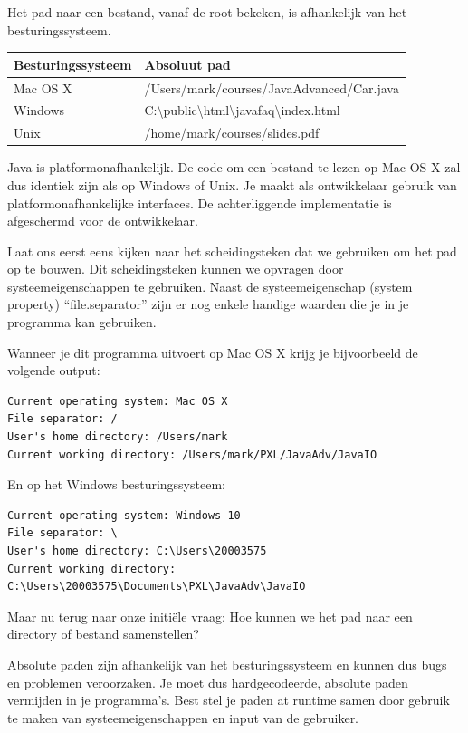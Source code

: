 Het pad naar een bestand, vanaf de root bekeken, is afhankelijk van het besturingssysteem.

\begin{table}[h!]
\centering
\begin{tabularx}{\textwidth}{| l | X |}
 \hline
 Besturingssysteem & Absoluut pad\\ 
 \hline
 Mac OS X & /Users/mark/courses/JavaAdvanced/Car.java \\
 Windows & C:\textbackslash public\textbackslash html\textbackslash javafaq\textbackslash index.html\\
 Unix & /home/mark/courses/slides.pdf \\
 \hline
 \end{tabularx}
 \end{table}
 
Java is platformonafhankelijk. De code om een bestand te lezen op Mac OS X zal dus identiek zijn als op Windows of Unix. Je maakt als ontwikkelaar gebruik van platformonafhankelijke interfaces. De achterliggende implementatie is afgeschermd voor de ontwikkelaar.
 
Laat ons eerst eens kijken naar het scheidingsteken dat we gebruiken om het pad op te bouwen.
Dit scheidingsteken kunnen we opvragen door systeemeigenschappen te gebruiken.  Naast de systeemeigenschap (system property) ``file.separator'' zijn er nog enkele handige waarden die je in je programma kan gebruiken.



Wanneer je dit programma uitvoert op Mac OS X krijg je bijvoorbeeld de volgende output:
\begin{verbatim}
Current operating system: Mac OS X
File separator: /
User's home directory: /Users/mark
Current working directory: /Users/mark/PXL/JavaAdv/JavaIO
\end{verbatim}

En op het Windows besturingssysteem:
\begin{verbatim}
Current operating system: Windows 10
File separator: \
User's home directory: C:\Users\20003575
Current working directory: C:\Users\20003575\Documents\PXL\JavaAdv\JavaIO
\end{verbatim}

Maar nu terug naar onze initi\"ele vraag: Hoe kunnen we het pad naar een directory of bestand samenstellen?

Absolute paden zijn afhankelijk van het besturingssysteem en kunnen dus bugs en problemen veroorzaken. Je moet dus hardgecodeerde, absolute paden vermijden in je programma's. Best stel je paden at runtime samen door gebruik te maken van systeemeigenschappen en input van de gebruiker.

